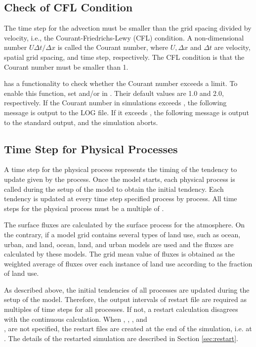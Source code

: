 \subsection{Check of CFL Condition} \label{subsec:cfl_check}

The time step for the advection  must be smaller than the grid spacing divided by velocity, i.e., the Courant-Friedrichs-Lewy (CFL) condition.
A non-dimensional number $U \Delta t/\Delta x$ is called the Courant number, where $U, \Delta x$ and $\Delta t$ are velocity, spatial grid spacing, and time step, respectively.
The CFL condition is that the Courant number must be smaller than 1.

\scalerm has a functionality to check whether the Courant number exceeds a limit.
To enable this function, set  and/or  in .
Their default values are 1.0 and 2.0, respectively.
If the Courant number in simulations exceeds , the following message is output to the LOG file.
If it exceeds , the following message is output to the standard output, and the simulation aborts.


\subsection{Time Step for Physical Processes}
A time step for the physical process represents the timing of the tendency to update given by the process. Once the model starts, each physical process is called during the setup of the model to obtain the initial tendency. Each tendency is updated at every time step specified process by process.
All time steps for the physical process must be a multiple of .

The surface fluxes are calculated by the surface process for the atmosphere.
On the contrary, if a model grid contains several types of land use, such as ocean, urban, and land,
ocean, land, and urban models are used and the fluxes are calculated by these models.
The grid mean value of fluxes is obtained as the weighted average of fluxes over each instance of land use according to the fraction of land use.

As described above, the initial tendencies of all processes are updated during the setup of the model.
Therefore, the output intervals of restart file are required as multiples of time steps for all processes.
If not, a restart calculation disagrees with the continuous calculation.
When , ,  , and\\ , are not specified,
the restart files are created at the end of the simulation, i.e. at .
The details of the restarted simulation are described in Section \ref{sec:restart}.


